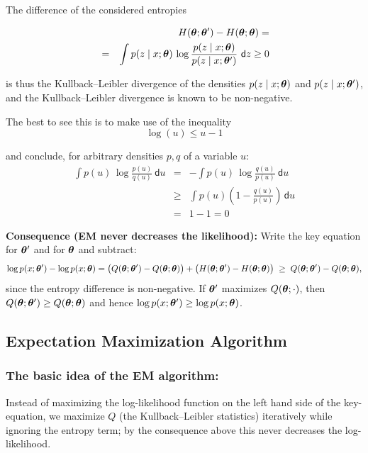 The difference of the considered entropies

  \begin{eqnarray*}
    & & \hspace{-1cm}H({\p};{\p'})-H(\p;{\p}) = \\
    &=& \int p(z\mid x;{\p}) \, \log \frac{p(z\mid x;{\p})}{p(z\mid x;{\p'})}\ \mathsf{d}z \ge 0
  \end{eqnarray*}

  is thus the Kullback--Leibler divergence of the densities $p(z\mid x;{\bm{\theta}})$ and $p(z\mid x;{\bm{\theta}'})$, and the Kullback--Leibler divergence is known to be non-negative.

  The best to see this is to make use of the inequality
  \begin{displaymath}
  \log(u) \leq u-1
  \end{displaymath}

  and conclude, for arbitrary densities $p,q$ of a variable $u$:
  \begin{eqnarray*}
    \int p(u) \, \log \frac{p(u)}{q(u)}\ \mathsf{d}u 
      & =  & -\int p(u) \, \log \frac{q(u)}{p(u)}\ \mathsf{d}u \\  
      &\geq& \int p(u) \left( 1 - \frac{q(u)}{p(u)} \right) \, \mathsf{d}u\\   
      & =  & 1-1 = 0
  \end{eqnarray*}

  \textbf{Consequence (EM never decreases the likelihood):} Write the key equation for $\bm{\theta}'$ and for $\bm{\theta}$ and subtract:
  \begin{displaymath}
    \log p(x;\bm{\theta}') - \log p(x;\bm{\theta}) = \big(Q(\bm{\theta};\bm{\theta}')-Q(\bm{\theta};\bm{\theta})\big) + \big(H(\bm{\theta};\bm{\theta}')-H(\bm{\theta};\bm{\theta})\big) \;\geq\; Q(\bm{\theta};\bm{\theta}')-Q(\bm{\theta};\bm{\theta}),
  \end{displaymath}
  since the entropy difference is non-negative. If $\bm{\theta}'$ maximizes $Q(\bm{\theta};\cdot)$, then $Q(\bm{\theta};\bm{\theta}')\ge Q(\bm{\theta};\bm{\theta})$ and hence $\log p(x;\bm{\theta}')\ge\log p(x;\bm{\theta})$.
  
\subsection{Expectation Maximization Algorithm}
\subsubsection{The basic idea of the EM algorithm:}
Instead of maximizing the log-likelihood function on the left hand side of the key-equation, we maximize $Q$ (the Kullback--Leibler statistics) iteratively while ignoring the entropy term; by the consequence above this never decreases the log-likelihood.
 

